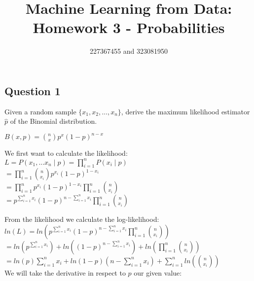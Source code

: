 \documentclass[12pt]{article}
\title{Machine Learning from Data: Homework 3 - Probabilities}
\author{227367455 and 323081950}
\begin{document}
    \maketitle

    \begin{center}
        \section*{Question 1}

    \end{center}
    Given a random sample $\lbrace x_1 , x_2 , ... , x_n \rbrace$, derive the
    maximum likelihood estimator $\hat{p}$ of the Binomial distribution. \\

    \begin{center}
        $ B(x,p) = \binom{n}{x} p^x (1-p)^{n-x}$
    \end{center}

    We first want to calculate the likelihood: \\

    $ L = P(x_1,...x_n \mid p) =  \prod^{n}_{i = 1} P(x_i \mid p) $ \\

    $ =  \prod^{n}_{i = 1} \binom{n}{x_i} p^{x_i} (1-p)^{1-x_i} $ \\

    $ = \prod^{n}_{i = 1} p^{x_i} (1-p)^{1-x_i}  \prod^{n}_{i = 1} \binom{n}{x_i}  $ \\

    $ = p^{\sum^{n}_{i = 1} x_i} (1-p)^{n - \sum^{n}_{i = 1} x_i}  \prod^{n}_{i = 1} \binom{n}{x_i} $ \\

    \newpage

    From the likelihood we calculate the log-likelihood: \\

    $ ln(L) = ln(p^{\sum^{n}_{i = 1} x_i} (1-p)^{n - \sum^{n}_{i = 1} x_i}  \prod^{n}_{i = 1} \binom{n}{x_i}) $ \\

    $ =  ln(p^{\sum^{n}_{i = 1} x_i}) + ln( (1-p)^{n - \sum^{n}_{i = 1} x_i}) + ln(\prod^{n}_{i = 1} \binom{n}{x_i})  $ \\

    $ = ln(p) \sum^{n}_{i = 1} x_i + ln( 1-p) (n - \sum^{n}_{i = 1} x_i) +  \sum^{n}_{i = 1} ln(\binom{n}{x_i})$ \\

    We will take the derivative in respect to $p$ our given value: \\
\end{document}
